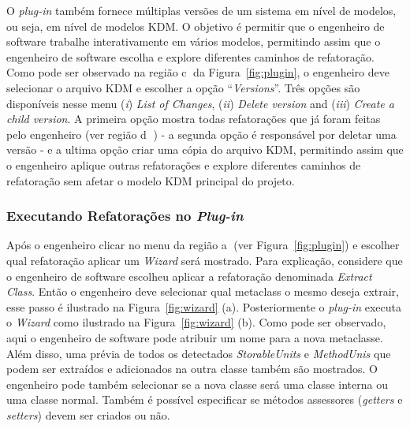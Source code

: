 O \textit{plug-in} também fornece múltiplas versões de um sistema em nível de modelos, ou seja, em nível de modelos KDM. O objetivo é permitir que o engenheiro de software trabalhe interativamente em vários modelos, permitindo assim que o engenheiro de software escolha e explore diferentes caminhos de refatoração. Como pode ser observado na região  \textcircled{c} da Figura~\ref{fig:plugin}, o engenheiro deve selecionar o arquivo KDM e escolher a opção ``\textit{Versions}''. Três opções são disponíveis nesse menu (\textit{i}) \textit{List of Changes}, (\textit{ii}) \textit{Delete version} and (\textit{iii}) \textit{Create a child version}. A primeira opção mostra todas refatorações que já foram feitas pelo engenheiro (ver região \textcircled{d} ) - a segunda opção é responsável por deletar uma versão - e a ultima opção criar uma cópia do arquivo KDM, permitindo assim que o engenheiro aplique outras refatorações e explore diferentes caminhos de refatoração sem afetar o modelo KDM principal do projeto.


 \subsubsection{Executando Refatorações no \textit{Plug-in}}

Após o engenheiro clicar no menu da região \textcircled{a} (ver Figura~\ref{fig:plugin}) e escolher qual refatoração aplicar um \textit{Wizard} será mostrado. Para explicação, considere que o engenheiro de software escolheu aplicar a refatoração denominada \textit{Extract Class}. Então o engenheiro deve selecionar qual metaclass o mesmo deseja extrair, esse passo é ilustrado na Figura~\ref{fig:wizard} (a). Posteriormente o \textit{plug-in} executa o \textit{Wizard} como ilustrado na Figura~\ref{fig:wizard} (b). Como pode ser observado, aqui o engenheiro de software pode atribuir um nome para a nova metaclasse. Além disso, uma prévia de todos os detectados \textit{StorableUnits} e \textit{MethodUnis} que podem ser extraídos e adicionados na outra classe também são mostrados. O engenheiro pode também selecionar se a nova classe será uma classe interna ou uma classe normal. Também é possível especificar se métodos assessores (\textit{getters} e \textit{setters}) devem ser criados ou não. 

